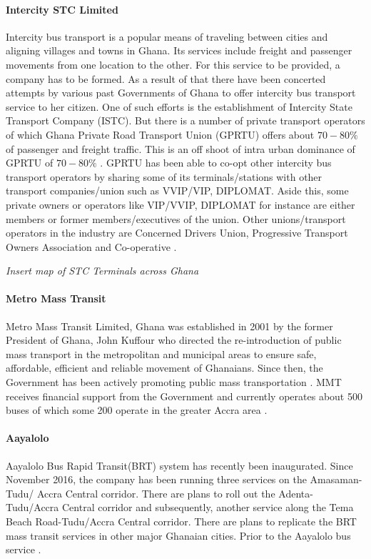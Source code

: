 \paragraph{Intercity STC Limited}
Intercity bus transport is a popular means of traveling between cities and aligning villages and towns in Ghana. Its services include freight and passenger movements from one location to the other. For this service to be provided, a company has to be formed. As a result of that there have been concerted attempts by various past Governments of Ghana to offer intercity bus transport service to her citizen. One of such efforts is the establishment of Intercity State Transport Company (ISTC). But there is a number of private transport operators 
of which Ghana Private Road Transport Union (GPRTU) offers about $70-80\%$ of passenger and freight traffic. This is an off shoot of intra urban dominance of GPRTU of $70-80\%$ \citep{abane2011travel}. GPRTU has been able to co-opt other intercity bus transport operators by sharing some of its terminals/stations with other transport 
companies/union such as VVIP/VIP, DIPLOMAT. Aside this, some private owners or operators like VIP/VVIP, DIPLOMAT for instance are either members or former members/executives of the union. Other unions/transport operators in the industry are Concerned Drivers Union, Progressive Transport Owners Association and Co-operative \citep{ojobus}.

\textit{Insert map of STC Terminals across Ghana}

\paragraph{Metro Mass Transit}
Metro  Mass  Transit  Limited, Ghana was established in 2001 by the former President of Ghana, John Kuffour who directed the re-introduction of public mass transport in the metropolitan and municipal areas to ensure safe, affordable, efficient and reliable movement of Ghanaians. Since then, the Government has been actively promoting public mass transportation \citep{olateju2009appraisal}. MMT receives financial support from the Government and currently operates about 500 buses of which some 200 operate in the greater Accra area \citep{finn2009new}.

\paragraph{Aayalolo}
Aayalolo Bus Rapid Transit(BRT) system has recently been inaugurated. Since November 2016, the company has been running three services on the Amasaman-Tudu/
Accra Central corridor. There are plans to roll out the Adenta-Tudu/Accra Central corridor and subsequently, another service along the Tema Beach Road-Tudu/Accra Central corridor. There are plans to replicate the BRT mass transit services in other major Ghanaian cities. Prior to the Aayalolo bus service \citep{agyemang2017mode}.

